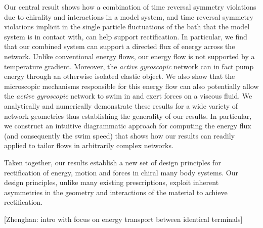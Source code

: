 \documentclass[
 preprint,
 preprintnumbers,
 amsmath,amssymb,
 aps,
 pre,
 longbibliography,
 superscriptaddress,
 10pt, twocolumn
]{revtex4-1}
\begin{document}
Our central result shows how a combination of time reversal symmetry violations due to chirality and interactions in a model system, and time reversal symmetry violations implicit in the single particle fluctuations of the bath that the model system is in contact with, can help support rectification. In particular, we find that our combined system can support a directed flux of energy across the network. Unlike conventional energy flows, our energy flow is not supported by a temperature gradient. Moreover, the \textit{active gyroscopic} network can in fact pump energy through an otherwise isolated elastic object. We also show that the microscopic mechanisms responsible for this energy flow can also potentially allow the \textit{active gyroscopic} network to swim in and exert forces on a viscous fluid. We analytically and numerically demonstrate these results for a wide variety of network geometries thus establishing the generality of our results. In particular, we construct an intuitive diagrammatic approach for computing the energy flux (and consequently the swim speed) that shows how our results can readily applied to tailor flows in arbitrarily complex networks.

Taken together, our results establish a new set of design principles for rectification of energy, motion and forces in chiral many body systems. Our design principles, unlike many existing prescriptions, exploit inherent asymmetries in the geometry and interactions of the material to achieve rectification.





[Zhenghan: intro with focus on energy transport between identical terminals]
\end{document}
